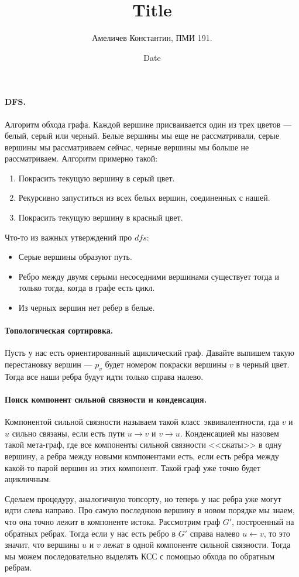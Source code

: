 \documentclass[12pt]{article}
\title{Title}
\author{Амеличев Константин, ПМИ 191.}
\date{Date}
\begin{document}
\paragraph{DFS.} Алгоритм обхода графа. Каждой вершине присваивается один из трех цветов --- белый, серый или черный. Белые вершины мы еще не рассматривали, серые вершины мы рассматриваем сейчас, черные вершины мы больше не рассматриваем. Алгоритм примерно такой:
\begin{enumerate}
\item Покрасить текущую вершину в серый цвет.
\item Рекурсивно запуститься из всех белых вершин, соединенных с нашей.
\item Покрасить текущую вершину в красный цвет.
\end{enumerate}

Что-то из важных утверждений про $dfs$:

\begin{itemize}
\item Серые вершины образуют путь.
\item Ребро между двумя серыми несоседними вершинами существует тогда и только тогда, когда в графе есть цикл.
\item Из черных вершин нет ребер в белые.
\end{itemize}

\paragraph{Топологическая сортировка.} Пусть у нас есть ориентированный ациклический граф. Давайте выпишем такую перестановку вершин --- $p_v$ будет номером покраски вершины $v$ в черный цвет. Тогда все наши ребра будут идти только справа налево.

\paragraph{Поиск компонент сильной связности и конденсация.} Компонентой сильной связности называем такой класс эквивалентности, гда $v$ и $u$ сильно связаны, если есть пути $u \rightarrow v$ и $v \rightarrow u$. Конденсацией мы назовем такой мета-граф, где все компоненты сильной связности <<сжаты>> в одну вершину, а ребра между новыми компонентами есть, если есть ребра между какой-то парой вершин из этих компонент. Такой граф уже точно будет ацикличным.

Сделаем процедуру, аналогичную топсорту, но теперь у нас ребра уже могут идти слева направо. Про самую последнюю вершину в новом порядке мы знаем, что она точно лежит в компоненте истока. Рассмотрим граф $G'$, построенный на обратных ребрах. Тогда если у нас есть ребро в $G'$ справа налево $u \leftarrow v$, то это значит, что вершины $u$ и $v$ лежат в одной компоненте сильной связности. Тогда мы можем последовательно выделять КСС с помощью обхода по обратным ребрам.
\end{document}
